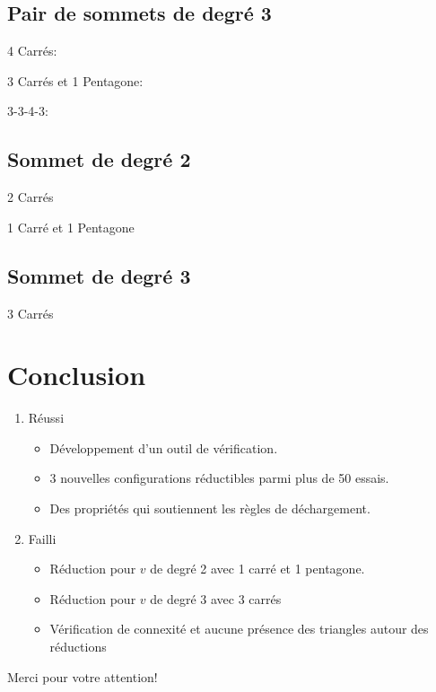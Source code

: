 \documentclass{beamer}
\begin{document}
\subsection{Pair de sommets de degré 3}
\begin{frame}
4 Carrés:
\end{frame}

\begin{frame}
3 Carrés et 1 Pentagone:
\end{frame}

\begin{frame}
3-3-4-3:

\end{frame}

\subsection{Sommet de degré 2}
\begin{frame}
2 Carrés
\end{frame}

\begin{frame}
1 Carré et 1 Pentagone
\end{frame}

\subsection{Sommet de degré 3}
\begin{frame}
3 Carrés
\end{frame}

\section{Conclusion}
\begin{frame}
\begin{enumerate}
\item Réussi
\begin{itemize}
\item Développement d'un outil de vérification.
\item 3 nouvelles configurations réductibles parmi plus de 50 essais.
\item Des propriétés qui soutiennent les règles de déchargement.
\end{itemize}
\item Failli
\begin{itemize}
\item Réduction pour $v$ de degré 2 avec 1 carré et 1 pentagone.
\item Réduction pour $v$ de degré 3 avec 3 carrés
\item Vérification de connexité et aucune présence des triangles autour des réductions
\end{itemize}
\end{enumerate}

\end{frame}

\begin{frame}
\begin{center}
Merci pour votre attention!
\end{center}
\end{frame}
\end{document}
